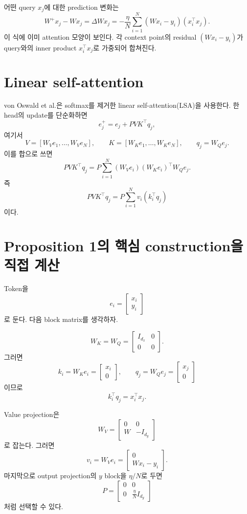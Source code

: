\documentclass[11pt,a4paper,oneside,openany]{memoir}
\theoremstyle{definition}
\begin{document}
어떤 query $x_j$에 대한 prediction 변화는
\[
W^+x_j-Wx_j
=\Delta W x_j
=-\frac\eta N\sum_{i=1}^N(Wx_i-y_i)(x_i^\top x_j).
\]
이 식에 이미 attention 모양이 보인다. 각 context point의 residual $(Wx_i-y_i)$가 query와의 inner product $x_i^\top x_j$로 가중되어 합쳐진다.

\section{Linear self-attention}

von Oswald et al.은 softmax를 제거한 linear self-attention(LSA)을 사용한다.
한 head의 update를 단순화하면
\[
e_j^+
=e_j+P V K^\top q_j,
\]
여기서
\[
V=[W_Ve_1,\ldots,W_Ve_N],
\qquad
K=[W_Ke_1,\ldots,W_Ke_N],
\qquad
q_j=W_Qe_j.
\]
이를 합으로 쓰면
\[
PVK^\top q_j
=P\sum_{i=1}^N(W_Ve_i)(W_Ke_i)^\top W_Qe_j.
\]
즉
\[
\boxed{
PVK^\top q_j
=
P\sum_{i=1}^N v_i(k_i^\top q_j)
}
\]
이다.

\section{Proposition 1의 핵심 construction을 직접 계산}

Token을
\[
e_i=
\begin{bmatrix}
x_i\\y_i
\end{bmatrix}
\]
로 둔다. 다음 block matrix를 생각하자.

\[
W_K=W_Q=
\begin{bmatrix}
I_{d_x}&0\\
0&0
\end{bmatrix}.
\]
그러면
\[
k_i=W_Ke_i=
\begin{bmatrix}x_i\\0\end{bmatrix},
\qquad
q_j=W_Qe_j=
\begin{bmatrix}x_j\\0\end{bmatrix}
\]
이므로
\[
k_i^\top q_j=x_i^\top x_j.
\]

Value projection은
\[
W_V=
\begin{bmatrix}
0&0\\
W&-I_{d_y}
\end{bmatrix}
\]
로 잡는다. 그러면
\[
v_i=W_Ve_i
=
\begin{bmatrix}
0\\Wx_i-y_i
\end{bmatrix}.
\]
마지막으로 output projection의 $y$ block을 $\eta/N$로 두면
\[
P=
\begin{bmatrix}
0&0\\
0&\frac\eta N I_{d_y}
\end{bmatrix}
\]
처럼 선택할 수 있다.
\end{document}
